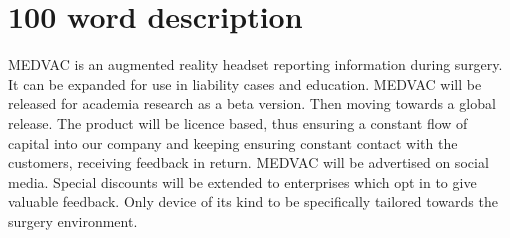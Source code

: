 \documentclass{article}
\begin{document}


\thispagestyle{empty}
\cleardoublepage
{}
\setcounter{page}{1}


\section{100 word description }\label{sec:intro}


MEDVAC is an augmented reality headset reporting information during surgery. It can be expanded for use in liability cases and education.
MEDVAC will be released for academia research as a beta version. Then moving towards a global release. The product will be licence based, thus ensuring a constant flow of capital into our company and keeping ensuring constant contact with the customers, receiving feedback in return.
MEDVAC will be advertised on social media. Special discounts will be extended to enterprises which opt in to give valuable feedback.
Only device of its kind to be specifically tailored towards the surgery environment.
\end{document}
